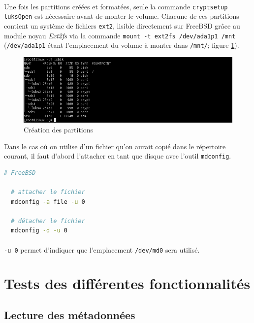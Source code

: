 \paragraph{}
Une fois les partitions créées et formatées, seule la commande
\texttt{cryptsetup luksOpen} est nécessaire avant de monter le volume. Chacune
de ces partitions contient un système de fichiers \texttt{ext2}, lisible
directement sur FreeBSD grâce au module noyau \textit{Ext2fs} via la commande
\texttt{mount -t ext2fs /dev/ada1p1 /mnt} (\texttt{/dev/ada1p1} étant
l'emplacement du volume à monter dans \texttt{/mnt/}; figure
\ref{fig:linux_partitions}).
\begin{figure}[H]
  \centering
  \includegraphics[width=\linewidth]{tests/linux_partitions.png}
  \caption{\label{fig:linux_partitions}Création des partitions}
\end{figure}
Dans le cas où on utilise d'un fichier qu'on aurait copié dans le répertoire
courant, il faut d'abord l'attacher en tant que disque avec l'outil
\texttt{mdconfig}.
\\
\begin{lstlisting}[language=bash]
  # FreeBSD
  
  # attacher le fichier
  mdconfig -a file -u 0

  # détacher le fichier
  mdconfig -d -u 0
\end{lstlisting}
\paragraph{}
\texttt{-u 0} permet d'indiquer que l'emplacement \texttt{/dev/md0} sera
utilisé.

\section{Tests des différentes fonctionnalités}

\subsection{Lecture des métadonnées}
